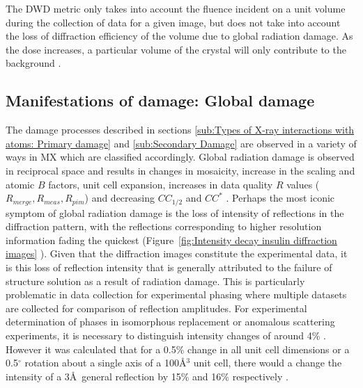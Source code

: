        The DWD metric only takes into account the fluence incident on a unit volume during the collection of data for a given image, but does not take into account the loss of diffraction efficiency of the volume due to global radiation damage.
        As the dose increases, a particular volume of the crystal will only contribute to the background \cite{blake1962}.

    \subsection{Manifestations of damage: Global damage}
    \label{sub:Manifestations of damage: Global damage}
        The damage processes described in sections \ref{sub:Types of X-ray interactions with atoms: Primary damage} and \ref{sub:Secondary Damage} are observed in a variety of ways in MX which are classified accordingly.
        Global radiation damage is observed in reciprocal space and results in changes in mosaicity, increase in the scaling and atomic $B$ factors, unit cell expansion, increases in data quality $R$ values ($R_{merge}, R_{meas}, R_{pim}$) and decreasing $CC_{1/2}$ and $CC^*$ \cite{garman2010}.
        Perhaps the most iconic symptom of global radiation damage is the loss of intensity of reflections in the diffraction pattern, with the reflections corresponding to higher resolution information fading the quickest (Figure~\ref{fig:Intensity decay insulin diffraction images} ).
        Given that the diffraction images constitute the experimental data, it is this loss of reflection intensity that is generally attributed to the failure of structure solution as a result of radiation damage.
        This is particularly problematic in data collection for experimental phasing where multiple datasets are collected for comparison of reflection amplitudes.
        For experimental determination of phases in isomorphous replacement or anomalous scattering experiments, it is necessary to distinguish intensity changes of around 4\% \cite{taylor2010}.
        However it was calculated that for a 0.5\% change in all unit cell dimensions or a 0.5$^{\circ}$ rotation about a single axis of a 100\AA$^3$ unit cell, there would a change the intensity of a 3\AA\ general reflection by 15\% and 16\% respectively \cite{crick1956}.
